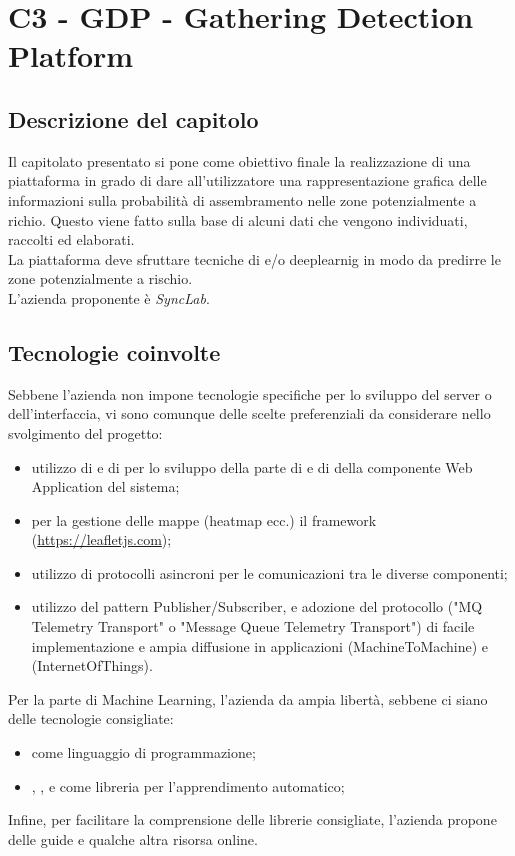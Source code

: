 \section{C3 - GDP - Gathering Detection Platform}

\subsection{Descrizione del capitolo}
Il capitolato presentato si pone come obiettivo finale la realizzazione di una piattaforma in grado di dare all'utilizzatore una rappresentazione grafica delle informazioni sulla probabilità di assembramento nelle zone potenzialmente a richio. Questo viene fatto sulla base di alcuni dati che vengono individuati, raccolti ed elaborati. \\
La piattaforma deve sfruttare tecniche di  e/o deeplearnig in modo da predirre le zone potenzialmente a rischio.\\
L'azienda proponente è \textit{SyncLab}.

\subsection{Tecnologie coinvolte}
Sebbene l'azienda non impone tecnologie specifiche per lo sviluppo del server o dell'interfaccia, vi sono comunque delle scelte preferenziali da considerare nello svolgimento del progetto:
\begin{itemize}
\item utilizzo di  e di  per lo sviluppo della parte di  e di  della componente Web Application del sistema;
\item per la gestione delle mappe (heatmap ecc.) il framework  (\url{https://leafletjs.com});
\item utilizzo di protocolli asincroni per le comunicazioni tra le diverse componenti;
\item utilizzo del pattern Publisher/Subscriber, e adozione del protocollo  ("MQ Telemetry Transport" o "Message Queue Telemetry Transport") di facile implementazione e ampia diffusione in applicazioni  (MachineToMachine) e  (InternetOfThings).
\end{itemize}
Per la parte di Machine Learning, l'azienda da ampia libertà, sebbene ci siano delle tecnologie consigliate:
\begin{itemize}
\item {} come linguaggio di programmazione;
\item {}, ,  e  come libreria per l'apprendimento automatico;
\end{itemize}
Infine, per facilitare la comprensione delle librerie consigliate, l'azienda propone delle guide e qualche altra risorsa online.


